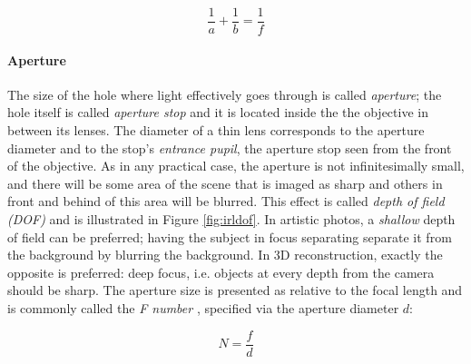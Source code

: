 \begin{equation} \label{eq:thinlens}
	\frac{1}{a} + \frac{1}{b} = \frac{1}{f}
\end{equation}





\paragraph{Aperture}
The size of the hole where light effectively goes through is called \emph{aperture}; the hole itself is called \emph{aperture stop} and it is located inside the the objective in between its lenses.
The diameter of a thin lens corresponds to the aperture diameter and to the stop's \emph{entrance pupil}, the aperture stop seen from the front of the objective.
\cite{greenleaf1950photographic}
As in any practical case, the aperture is not infinitesimally small, and there will be some area of the scene that is imaged as sharp and others in front and behind of this area will be blurred.
This effect is called \emph{depth of field (DOF)} and is illustrated in Figure \ref{fig:irldof}.
In artistic photos, a \emph{shallow} depth of field can be preferred; having the subject in focus separating separate it from the background by blurring the background.
In 3D reconstruction, exactly the opposite is preferred: deep focus, i.e. objects at every depth from the camera should be sharp.
The aperture size is presented as relative to the focal length and is commonly called the \emph{F number} \cite{szeliski10vision,greenleaf1950photographic}, specified via the aperture diameter $d$:

\begin{equation} \label{eq:fnumber}
	N = \frac{f}{d}
\end{equation}



